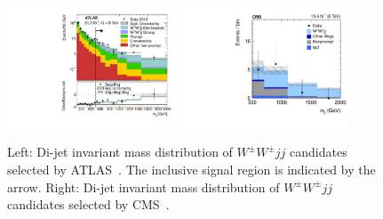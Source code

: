 \begin{figure}[p]
    \centering
    \includegraphics[width=0.45\textwidth]{figures/ss-exclboson-ww-ss-atlas8tev.pdf}
    \includegraphics[width=0.45\textwidth]{figures/ss-exclboson-ww-ss-cms8tev.pdf}
    \caption{
    Left: Di-jet invariant mass distribution of $W^{\pm} W^{\pm} jj$ candidates selected by ATLAS~\cite{Aad:2014zda}.  The inclusive signal region is indicated by the arrow.
    Right: Di-jet invariant mass distribution of $W^{\pm} W^{\pm} jj$ candidates selected by CMS~\cite{Khachatryan:2014sta}.  }
    \label{fig:ss-exclboson-ww-ss}
\end{figure}
